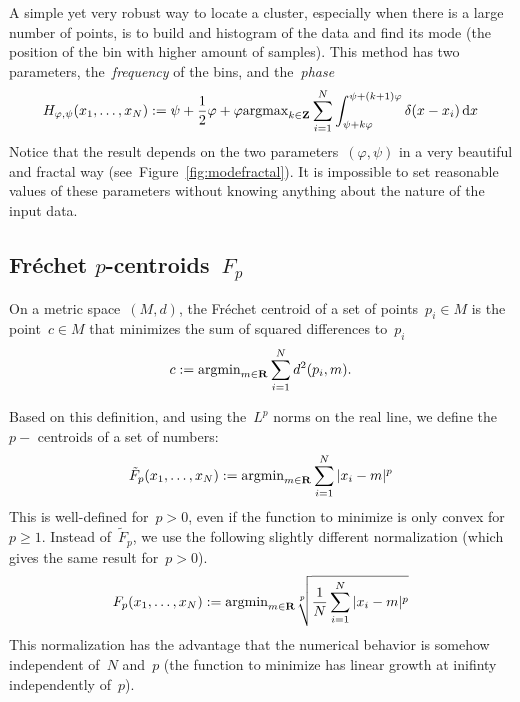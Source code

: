 A simple yet very robust way to locate a cluster, especially when
there is a large number of points, is to build and histogram of the
data and find its mode (the position of the bin with higher amount of
samples).  This method has two parameters, the~\emph{frequency} of the bins,
and the~\emph{phase}
\[
	H_{\varphi,\psi}(x_1,\ldots,x_N) :=
	\psi+\frac{1}{2}\varphi+\varphi\mathrm{argmax}_{k\in\mathbf{Z}}
	\sum_{i=1}^N\int_{\psi+k\varphi}^{\psi+(k+1)\varphi}
	\delta(x-x_i)\,\mathrm{d}x
\]
Notice
that the result depends on the two parameters~$(\varphi,\psi)$ in a
very beautiful and fractal way (see~Figure~\ref{fig:modefractal}).
It is impossible to set reasonable values of these parameters without
knowing anything about the nature of the input data.


\subsection{Fréchet $p$-centroids~$F_p$}

On a metric space~$(M,d)$, the Fréchet centroid of a set of
points~$p_i\in M$ is the point~$c\in M$ that minimizes the sum of
squared differences to~$p_i$
\[
	c := \mathrm{argmin}_{m\in\mathbf{R}}\sum_{i=1}^N d^2(p_i,m).
\]

Based on this definition, and using the~$L^p$ norms on the real line,
we define the~$p-$ centroids of a set of numbers:
\[
	\tilde F_p(x_1,\ldots,x_N) := \mathrm{argmin}_{m\in\mathbf{R}}\sum_{i=1}^N|x_i-m|^p
\]
This is well-defined for~$p>0$, even if the function to minimize is
only convex for~$p\ge1$.  Instead of~$\tilde F_p$, we use the
following slightly different normalization (which gives the same result for~$p>0$).
\[
	F_p(x_1,\ldots,x_N) :=
	\mathrm{argmin}_{m\in\mathbf{R}}\sqrt[p]{\frac{1}{N}\sum_{i=1}^N|x_i-m|^p}
\]
This normalization has the advantage that the numerical behavior is
somehow independent of~$N$ and~$p$  (the function to minimize has
linear growth at inifinty independently of~$p$).

